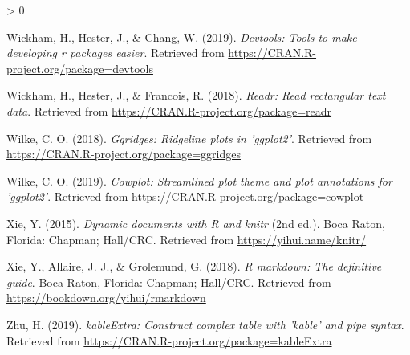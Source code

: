 \documentclass[
  english,
  doc,floatsintext]{apa6}
\newlength{\cslhangindent}
\newenvironment{CSLReferences}[2] %
 {%
  \setlength{\parindent}{0pt}
  \ifodd #1 \everypar{\setlength{\hangindent}{\cslhangindent}}\ignorespaces\fi
  \ifnum #2 > 0
  \setlength{\parskip}{#2\baselineskip}
  \fi
 }%
 {}
\begin{document}
\begin{CSLReferences}{1}{0}
\leavevmode\hypertarget{ref-R-devtools}{}%
Wickham, H., Hester, J., \& Chang, W. (2019). \emph{Devtools: Tools to make developing r packages easier}. Retrieved from \url{https://CRAN.R-project.org/package=devtools}

\leavevmode\hypertarget{ref-R-readr}{}%
Wickham, H., Hester, J., \& Francois, R. (2018). \emph{Readr: Read rectangular text data}. Retrieved from \url{https://CRAN.R-project.org/package=readr}

\leavevmode\hypertarget{ref-R-ggridges}{}%
Wilke, C. O. (2018). \emph{Ggridges: Ridgeline plots in 'ggplot2'}. Retrieved from \url{https://CRAN.R-project.org/package=ggridges}

\leavevmode\hypertarget{ref-R-cowplot}{}%
Wilke, C. O. (2019). \emph{Cowplot: Streamlined plot theme and plot annotations for 'ggplot2'}. Retrieved from \url{https://CRAN.R-project.org/package=cowplot}

\leavevmode\hypertarget{ref-R-knitr}{}%
Xie, Y. (2015). \emph{Dynamic documents with {R} and knitr} (2nd ed.). Boca Raton, Florida: Chapman; Hall/CRC. Retrieved from \url{https://yihui.name/knitr/}

\leavevmode\hypertarget{ref-R-rmarkdown}{}%
Xie, Y., Allaire, J. J., \& Grolemund, G. (2018). \emph{R markdown: The definitive guide}. Boca Raton, Florida: Chapman; Hall/CRC. Retrieved from \url{https://bookdown.org/yihui/rmarkdown}

\leavevmode\hypertarget{ref-R-kableExtra}{}%
Zhu, H. (2019). \emph{kableExtra: Construct complex table with 'kable' and pipe syntax}. Retrieved from \url{https://CRAN.R-project.org/package=kableExtra}

\end{CSLReferences}

\endgroup

\newpage
\end{document}

